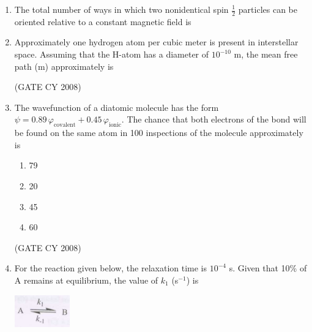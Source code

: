 \documentclass[12pt]{article}
\begin{document}
\begin{enumerate}
\item The total number of ways in which two nonidentical spin $\frac{1}{2}$ particles can be oriented relative to a constant magnetic field is
\begin{enumerate}
\end{enumerate}


\item Approximately one hydrogen atom per cubic meter is present in interstellar space. Assuming that the H-atom has a diameter of $10^{-10}$ m, the mean free path (m) approximately is
\begin{enumerate}
    \hfill{(GATE CY 2008)}
\end{enumerate}

\item The wavefunction of a diatomic molecule has the form $\psi = 0.89\, \varphi_{\text{covalent}} + 0.45\, \varphi_{\text{ionic}}$. The chance that both electrons of the bond will be found on the same atom in 100 inspections of the molecule approximately is

\begin{enumerate}
\item 79
\item 20
\item 45
\item 60
\end{enumerate}    \hfill{(GATE CY 2008)}




\item For the reaction given below, the relaxation time is $10^{-4}$ s. Given that 10\% of A remains at equilibrium, the value of $k_1$ (s$^{-1}$) is

\begin{center}
\includegraphics[width=0.3\columnwidth]{figs/q58.png}
\end{center}


\end{enumerate}
\end{document}
